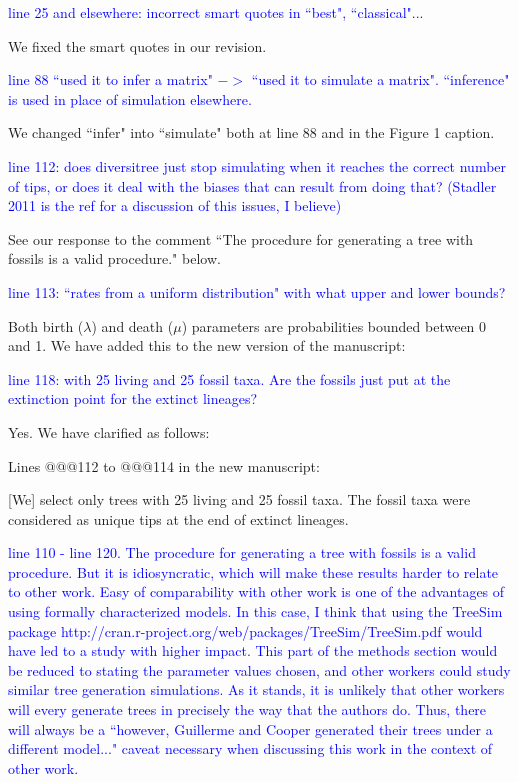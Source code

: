 \documentclass[11pt]{letter}
\begin{document}
\begin{letter}{}


\textcolor{blue}{line 25 and elsewhere: incorrect smart quotes in ``best", ``classical"...}

We fixed the smart quotes in our revision. %


\textcolor{blue}{line 88 ``used it to infer a matrix" $->$ ``used it to simulate a matrix". ``inference" is used in place of simulation elsewhere.}

We changed ``infer" into ``simulate" both at line 88 and in the Figure 1 caption.


\textcolor{blue}{line 112: does diversitree just stop simulating when it reaches the correct number of tips, or does it deal with the biases that can result from doing that? (Stadler 2011 is the ref for a discussion of this issues, I believe)}

See our response to the comment ``The procedure for generating a tree with fossils is a valid procedure." below.


\textcolor{blue}{line 113: ``rates from a uniform distribution" with what upper and lower bounds?}

Both birth ($\lambda$) and death ($\mu$) parameters are probabilities bounded between 0 and 1. We have added this to the new version of the manuscript:


\textcolor{blue}{line 118: with 25 living and 25 fossil taxa. Are the fossils just put at the extinction point for the extinct lineages?}

Yes. We have clarified as follows:

Lines @@@112 to @@@114 in the new manuscript:

\hfill\begin{minipage}{\dimexpr\textwidth-1cm}
[We] select only trees with 25 living and 25 fossil taxa. The fossil taxa were considered as unique tips at the end of extinct lineages. %
\end{minipage}


\textcolor{blue}{line 110 - line 120. The procedure for generating a tree with fossils is a valid procedure. But it is idiosyncratic, which will make these results harder to relate to other work. Easy of comparability with other work is one of the advantages of using formally characterized models. In this case, I think that using the TreeSim package http://cran.r-project.org/web/packages/TreeSim/TreeSim.pdf would have led to a study with higher impact. This part of the methods section would be reduced to stating the parameter values chosen, and other workers could study similar tree generation simulations. As it stands, it is unlikely that other workers will every generate trees in precisely the way that the authors do. Thus, there will always be a ``however, Guillerme and Cooper generated their trees under a different model..." caveat necessary when discussing this work in the context of other work.}


\end{letter}
\end{document}
